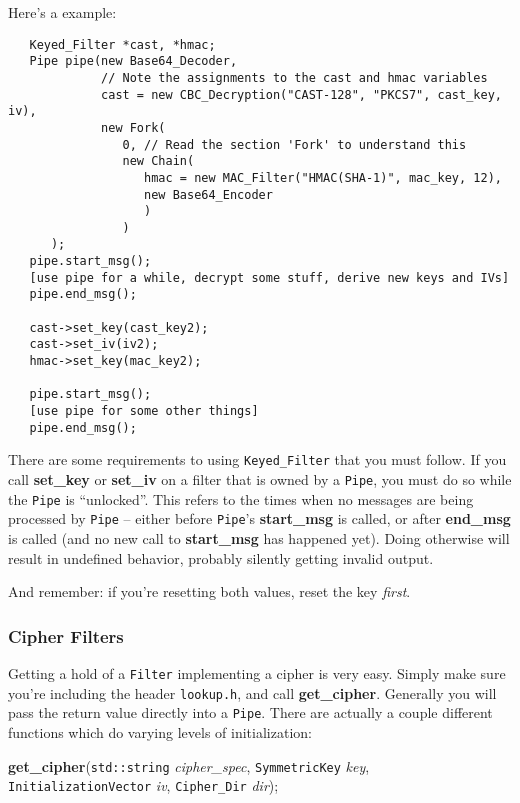 \documentclass{article}
\newcommand{\filename}[1]{\texttt{#1}}
\newcommand{\function}[1]{\textbf{#1}}
\newcommand{\type}[1]{\texttt{#1}}
\renewcommand{\arg}[1]{\textsl{#1}}
\begin{document}
Here's a example:

\begin{verbatim}
   Keyed_Filter *cast, *hmac;
   Pipe pipe(new Base64_Decoder,
             // Note the assignments to the cast and hmac variables
             cast = new CBC_Decryption("CAST-128", "PKCS7", cast_key, iv),
             new Fork(
                0, // Read the section 'Fork' to understand this
                new Chain(
                   hmac = new MAC_Filter("HMAC(SHA-1)", mac_key, 12),
                   new Base64_Encoder
                   )
                )
      );
   pipe.start_msg();
   [use pipe for a while, decrypt some stuff, derive new keys and IVs]
   pipe.end_msg();

   cast->set_key(cast_key2);
   cast->set_iv(iv2);
   hmac->set_key(mac_key2);

   pipe.start_msg();
   [use pipe for some other things]
   pipe.end_msg();
\end{verbatim}

There are some requirements to using \type{Keyed\_Filter} that you must
follow. If you call \function{set\_key} or \function{set\_iv} on a filter that
is owned by a \type{Pipe}, you must do so while the \type{Pipe} is
``unlocked''. This refers to the times when no messages are being processed by
\type{Pipe} -- either before \type{Pipe}'s \function{start\_msg} is called, or
after \function{end\_msg} is called (and no new call to \function{start\_msg}
has happened yet). Doing otherwise will result in undefined behavior, probably
silently getting invalid output.

And remember: if you're resetting both values, reset the key \emph{first}.

\subsubsection{Cipher Filters}

Getting a hold of a \type{Filter} implementing a cipher is very
easy. Simply make sure you're including the header
\filename{lookup.h}, and call \function{get\_cipher}. Generally you
will pass the return value directly into a \type{Pipe}. There are
actually a couple different functions which do varying levels of
initialization:

\function{get\_cipher}(\type{std::string} \arg{cipher\_spec},
                       \type{SymmetricKey} \arg{key},
                       \type{InitializationVector} \arg{iv},
                       \type{Cipher\_Dir} \arg{dir});
\end{document}
